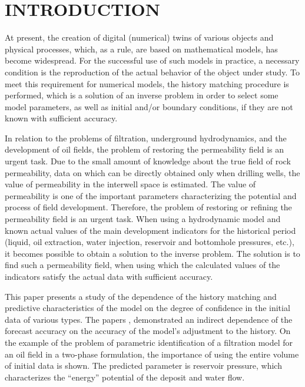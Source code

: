 \documentclass[
11pt,%
tightenlines,%
twoside,%
onecolumn,%
nofloats,%
nobibnotes,%
nofootinbib,%
superscriptaddress,%
noshowpacs,%
centertags]%
{revtex4}
\begin{document}
\section{INTRODUCTION}
	At present, the creation of digital (numerical) twins of various objects and physical processes, which, as a rule, are based on mathematical models, has become widespread. For the successful use of such models in practice, a necessary condition is the reproduction of the actual behavior of the object under study. To meet this requirement for numerical models, the history matching procedure is performed, which is a solution of an inverse problem in order to select some model parameters, as well as initial and/or boundary conditions, if they are not known with sufficient accuracy. 
	
	In relation to the problems of filtration, underground hydrodynamics, and the development of oil fields, the problem of restoring the permeability field is an urgent task. Due to the small amount of knowledge about the true field of rock permeability, data on which can be directly obtained only when drilling wells, the value of permeability in the interwell space is estimated. The value of permeability is one of the important parameters characterizing the potential and process of field development. Therefore, the problem of restoring or refining the permeability field is an urgent task. When using a hydrodynamic model and known actual values of the main development indicators for the historical period (liquid, oil extraction, water injection, reservoir and bottomhole pressures, etc.), it becomes possible to obtain a solution to the inverse problem. The solution is to find such a permeability field, when using which the calculated values of the indicators satisfy the actual data with sufficient accuracy.

	This paper presents a study of the dependence of the history matching and predictive characteristics of the model on the degree of confidence in the initial data of various types. The papers \cite{mus}, \cite{kos} demonstrated an indirect dependence of the forecast accuracy on the accuracy of the model's adjustment to the history. On the example of the problem of parametric identification of a filtration model for an oil field in a two-phase formulation, the importance of using the entire volume of initial data is shown. The predicted parameter is reservoir pressure, which characterizes the “energy” potential of the deposit and water flow.
\end{document}
